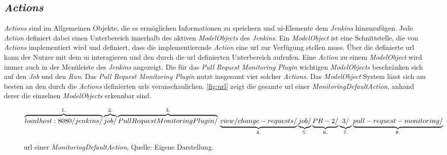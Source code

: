 


\subsection{\textit{Actions}}
\label{chap:actions}
\textit{Actions} sind im Allgemeinen Objekte, die es ermöglichen Informationen zu speichern und \ac{ui}-Elemente dem \textit{Jenkins} hinzuzufügen. Jede \textit{Action} definiert dabei einen Unterbereich innerhalb des aktiven \textit{ModelObjects} des \textit{Jenkins}. Ein \textit{ModelObject} ist eine Schnittstelle, die von \textit{Actions} implementiert wird und definiert, dass die implementierende \textit{Action} eine \ac{url} zur Verfügung stellen muss. Über die definierte \ac{url} kann der Nutzer mit dem \ac{ui} interagieren und den durch die \ac{url} definierten Unterbereich aufrufen. Eine \textit{Action} zu einem \textit{ModelObject} wird immer auch in der Menüleiste des \textit{Jenkins} angezeigt. Die für das \textit{Pull Request Monitoring Plugin} wichtigen \textit{ModelObjects} beschränken sich auf den \textit{Job} und den \textit{Run}. Das \textit{Pull Request Monitoring Plugin} nutzt insgesamt vier solcher \textit{Actions}. 
Das \textit{ModelObject} System lässt sich am besten an den durch die \textit{Actions} definierten \acp{url} veranschaulichen. \autoref{fig:url} zeigt die gesamte \ac{url} einer \textit{MonitoringDefaultAction}, anhand derer die einzelnen \textit{ModelObjects} erkennbar sind.

\begin{figure}[ht!]

$\overbrace{localhost:8080/jenkins/}^{1.}\overbrace{job/}^{2.}\overbrace{PullRequestMonitoringPlugin/}^{3.} \\
\underbrace{view/change-requests/}_{4.}\underbrace{job/}_{5.}\underbrace{PR-2/}_{6.}\underbrace{3/}_{7.}\underbrace{pull-request-monitoring/}_{8.} $

\caption[\ac{url} einer \textit{MonitoringDefaultAction}.]{\ac{url} einer \textit{MonitoringDefaultAction}, Quelle: Eigene Darstellung.}
\label{fig:url}
\end{figure}

